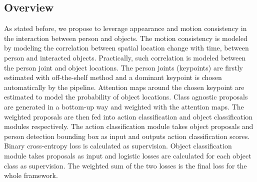 \subsection{Overview}
As stated before, we propose to leverage appearance and motion consistency in the interaction between person and objects. The motion consistency is modeled by modeling the correlation between spatial location change with time, between person and interacted objects. Practically, such correlation is modeled between the person joint and object locations. The person joints (keypoints) are firstly estimated with off-the-shelf method and a dominant keypoint is chosen automatically by the pipeline. Attention maps around the chosen keypoint are estimated to model the probability of object locations. Class agnostic proposals are generated in a bottom-up way and weighted with the attention maps. The weighted proposals are then fed into action classification and object classification modules respectively. The action classification module takes object proposals and person detection bounding box as input and outputs action classification scores. Binary cross-entropy loss is calculated as supervision. Object classification module takes proposals as input and logistic losses are calculated for each object class as supervision. The weighted sum of the two losses is the final loss for the whole framework. 


